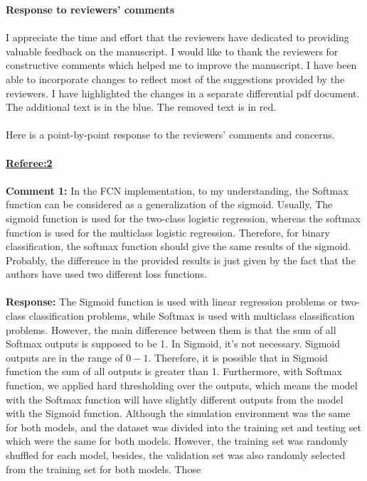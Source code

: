 \documentclass[11pt,a4paper]{article}
\begin{document}
	\textbf{Response to reviewers' comments} 
	\\ \\
	I appreciate the time and effort that the reviewers have dedicated to providing valuable feedback on the manuscript. I would like to thank the reviewers for constructive comments which helped me to improve the manuscript. I have been able to incorporate changes to reflect most of the suggestions provided by the reviewers. I have highlighted the changes in a separate differential pdf document. The additional text is in the blue. The removed text is in red.
	\\ \\
	Here is a point-by-point response to the reviewers' comments and concerns.
	\\ \\
	\underline{\textbf{Referee:2}} 	
	\\
	\\
	\textbf{Comment 1:} In the FCN implementation, to my understanding, the Softmax function can be considered as a generalization of the sigmoid. Usually, The sigmoid function is used for the two-class logistic regression, whereas the softmax function is used for the multiclass logistic regression.
	Therefore, for binary classification, the softmax function should give the same results of the sigmoid. Probably, the difference in the provided results is just given by the fact that the authors have used two different loss functions.
	\\ \\
	\color{blue}\textbf{Response:} The Sigmoid function is used with linear regression problems or two-class classification problems,
	while Softmax is used with multiclass classification problems. However, the main difference between
	them is that the sum of all Softmax outputs is supposed to be 1. In Sigmoid, it's not necessary. Sigmoid outputs
	are in the range of \(0-1\). Therefore, it is possible that in Sigmoid function the sum of all outputs is greater than
	1. Furthermore, with Softmax function, we applied hard thresholding over the outputs, which means the model
	with the Softmax function will have slightly different outputs from the model with the Sigmoid function. Although
	the simulation environment was the same for both models, and the dataset was divided into the training
	set and testing set which were the same for both models. However, the training set was randomly shuffled for
	each model, besides, the validation set was also randomly selected from the training set for both models. Those
\end{document}
